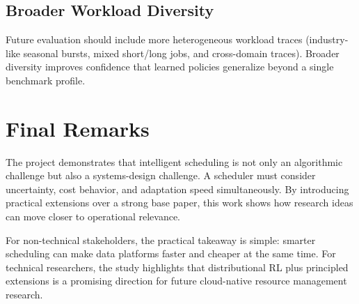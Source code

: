 \subsection{Broader Workload Diversity}
Future evaluation should include more heterogeneous workload traces (industry-like seasonal bursts, mixed short/long jobs, and cross-domain traces). Broader diversity improves confidence that learned policies generalize beyond a single benchmark profile.

\section{Final Remarks}
The project demonstrates that intelligent scheduling is not only an algorithmic challenge but also a systems-design challenge. A scheduler must consider uncertainty, cost behavior, and adaptation speed simultaneously. By introducing practical extensions over a strong base paper, this work shows how research ideas can move closer to operational relevance.

For non-technical stakeholders, the practical takeaway is simple: smarter scheduling can make data platforms faster and cheaper at the same time. For technical researchers, the study highlights that distributional RL plus principled extensions is a promising direction for future cloud-native resource management research.
